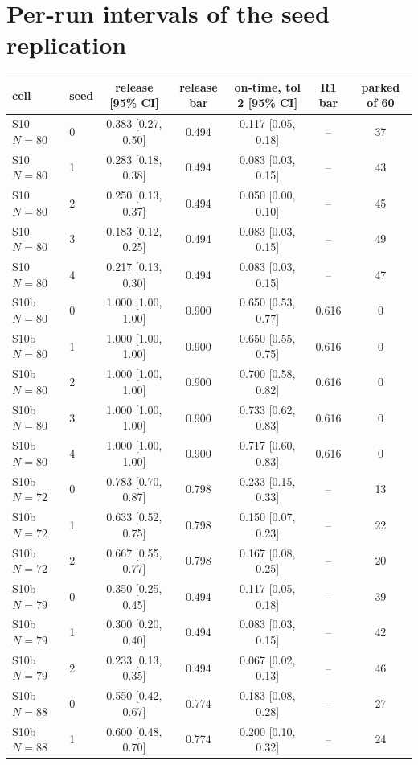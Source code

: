 \documentclass[11pt]{article}
\begin{document}
\appendix
\section{Per-run intervals of the seed replication}
\label{app:seeds}
\begin{table}[h]
\centering\small
\begin{tabular}{llccccc}
\toprule
cell & seed & release [95\% CI] & release bar & on-time, tol 2 [95\% CI] & R1 bar & parked of 60 \\
\midrule
S10 $N{=}80$ & 0 & 0.383 [0.27, 0.50] & 0.494 & 0.117 [0.05, 0.18] & -- & 37 \\
S10 $N{=}80$ & 1 & 0.283 [0.18, 0.38] & 0.494 & 0.083 [0.03, 0.15] & -- & 43 \\
S10 $N{=}80$ & 2 & 0.250 [0.13, 0.37] & 0.494 & 0.050 [0.00, 0.10] & -- & 45 \\
S10 $N{=}80$ & 3 & 0.183 [0.12, 0.25] & 0.494 & 0.083 [0.03, 0.15] & -- & 49 \\
S10 $N{=}80$ & 4 & 0.217 [0.13, 0.30] & 0.494 & 0.083 [0.03, 0.15] & -- & 47 \\
S10b $N{=}80$ & 0 & 1.000 [1.00, 1.00] & 0.900 & 0.650 [0.53, 0.77] & 0.616 & 0 \\
S10b $N{=}80$ & 1 & 1.000 [1.00, 1.00] & 0.900 & 0.650 [0.55, 0.75] & 0.616 & 0 \\
S10b $N{=}80$ & 2 & 1.000 [1.00, 1.00] & 0.900 & 0.700 [0.58, 0.82] & 0.616 & 0 \\
S10b $N{=}80$ & 3 & 1.000 [1.00, 1.00] & 0.900 & 0.733 [0.62, 0.83] & 0.616 & 0 \\
S10b $N{=}80$ & 4 & 1.000 [1.00, 1.00] & 0.900 & 0.717 [0.60, 0.83] & 0.616 & 0 \\
S10b $N{=}72$ & 0 & 0.783 [0.70, 0.87] & 0.798 & 0.233 [0.15, 0.33] & -- & 13 \\
S10b $N{=}72$ & 1 & 0.633 [0.52, 0.75] & 0.798 & 0.150 [0.07, 0.23] & -- & 22 \\
S10b $N{=}72$ & 2 & 0.667 [0.55, 0.77] & 0.798 & 0.167 [0.08, 0.25] & -- & 20 \\
S10b $N{=}79$ & 0 & 0.350 [0.25, 0.45] & 0.494 & 0.117 [0.05, 0.18] & -- & 39 \\
S10b $N{=}79$ & 1 & 0.300 [0.20, 0.40] & 0.494 & 0.083 [0.03, 0.15] & -- & 42 \\
S10b $N{=}79$ & 2 & 0.233 [0.13, 0.35] & 0.494 & 0.067 [0.02, 0.13] & -- & 46 \\
S10b $N{=}88$ & 0 & 0.550 [0.42, 0.67] & 0.774 & 0.183 [0.08, 0.28] & -- & 27 \\
S10b $N{=}88$ & 1 & 0.600 [0.48, 0.70] & 0.774 & 0.200 [0.10, 0.32] & -- & 24 \\

\end{tabular}
\end{table}
\end{document}
